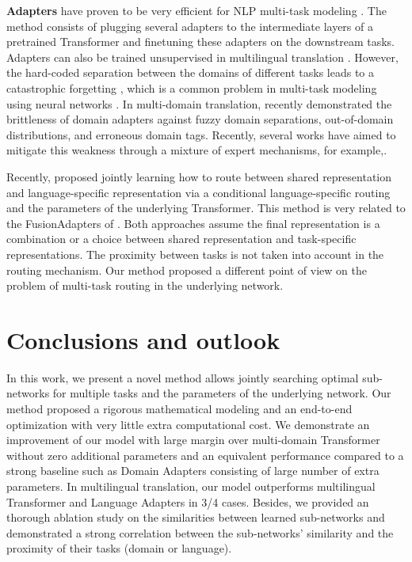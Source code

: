 \documentclass[11pt]{article}
\begin{document}
\textbf{Adapters} have proven to be very efficient for NLP multi-task modeling \citep{houlsby19parameter,Bapna19simple,Pham20Study,pfeiffer20adapterhub}. The method consists of plugging several adapters to the intermediate layers of a pretrained Transformer and finetuning these adapters on the downstream tasks. Adapters can also be trained unsupervised in multilingual translation \citep{Philip20monolingual}. However, the hard-coded separation between the domains of different tasks leads to a catastrophic forgetting \citep{pfeiffer21adapterfusion}, which is a common problem in multi-task modeling using neural networks \cite{Michael89catastrophic}. In multi-domain translation, recently \citet{Pham21revisiting} demonstrated the brittleness of domain adapters against fuzzy domain separations, out-of-domain distributions, and erroneous domain tags. Recently, several works have aimed to mitigate this weakness through a mixture of expert mechanisms, for example,\cite{pfeiffer21adapterfusion}.

Recently, \citet{biao21share} proposed jointly learning how to route between shared representation and language-specific representation via a conditional language-specific routing and the parameters of the underlying Transformer. This method is very related to the FusionAdapters of \cite{pfeiffer21adapterfusion}. Both approaches assume the final representation is a combination or a choice between shared representation and task-specific representations. The proximity between tasks is not taken into account in the routing mechanism. Our method proposed a different point of view on the problem of multi-task routing in the underlying network.

\section{Conclusions and outlook}
In this work, we present a novel method allows jointly searching optimal sub-networks for multiple tasks and the parameters of the underlying network. Our method proposed a rigorous mathematical modeling and an end-to-end optimization with very little extra computational cost. We demonstrate an improvement of our model with large margin over multi-domain Transformer without zero additional parameters and an equivalent performance compared to a strong baseline such as Domain Adapters consisting of large number of extra parameters. In multilingual translation, our model outperforms multilingual Transformer and Language Adapters in 3/4 cases. Besides, we provided an thorough ablation study on the similarities between learned sub-networks and demonstrated a strong correlation between the sub-networks' similarity and the proximity of their tasks (domain or language).
\end{document}
